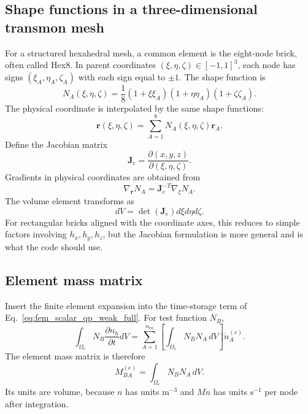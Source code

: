 \documentclass[11pt]{article}
\newcommand{\br}{{\bm{r}}}
\begin{document}
\subsection{Shape functions in a three-dimensional transmon mesh}
For a structured hexahedral mesh, a common element is the eight-node brick, often called Hex8. In parent coordinates $(\xi,\eta,\zeta)\in[-1,1]^3$, each node has signs $(\xi_A,\eta_A,\zeta_A)$ with each sign equal to $\pm1$. The shape function is
\begin{equation}
N_A(\xi,\eta,\zeta)=\frac{1}{8}(1+\xi\xi_A)(1+\eta\eta_A)(1+\zeta\zeta_A).
\label{eq:fem_hex8_shape}
\end{equation}
The physical coordinate is interpolated by the same shape functions:
\begin{equation}
\br(\xi,\eta,\zeta)=\sum_{A=1}^{8}N_A(\xi,\eta,\zeta)\br_A.
\end{equation}
Define the Jacobian matrix
\begin{equation}
\bm{J}_e=\frac{\partial(x,y,z)}{\partial(\xi,\eta,\zeta)}.
\end{equation}
Gradients in physical coordinates are obtained from
\begin{equation}
\nabla_{\br}N_A=\bm{J}_e^{-T}\nabla_{\xi}N_A.
\end{equation}
The volume element transforms as
\begin{equation}
dV=\det(\bm{J}_e)d\xi d\eta d\zeta.
\end{equation}
For rectangular bricks aligned with the coordinate axes, this reduces to simple factors involving $h_x,h_y,h_z$, but the Jacobian formulation is more general and is what the code should use.

\subsection{Element mass matrix}
Insert the finite element expansion into the time-storage term of Eq.~\eqref{eq:fem_scalar_qp_weak_full}. For test function $N_B$,
\begin{equation}
\int_{\Omega_e}N_B\frac{\partial n_h}{\partial t}dV
=\sum_{A=1}^{n_{en}}\left[\int_{\Omega_e}N_BN_A\,dV\right]\dot n_A^{(e)}.
\end{equation}
The element mass matrix is therefore
\begin{equation}
M_{BA}^{(e)}=\int_{\Omega_e}N_BN_A\,dV.
\label{eq:fem_qp_element_mass}
\end{equation}
Its units are volume, because $n$ has units $\mathrm{m^{-3}}$ and $M\dot n$ has units $\mathrm{s^{-1}}$ per node after integration.
\end{document}
